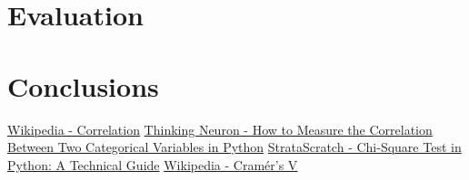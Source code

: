 \documentclass[runningheads]{paper}
\begin{document}

\section{Evaluation}

\section{Conclusions}


\pagebreak

\begin{thebibliography}{8}
    \bibitem{}
    \href{https://en.wikipedia.org/wiki/Correlation}{Wikipedia - Correlation}
    \bibitem{}
    \href{https://thinkingneuron.com/how-to-measure-the-correlation-between-two-categorical-variables-in-python/}{Thinking Neuron - How to Measure the Correlation Between Two Categorical Variables in Python}
    \bibitem{}
    \href{https://www.stratascratch.com/blog/chi-square-test-in-python-a-technical-guide/}{StrataScratch - Chi-Square Test in Python: A Technical Guide}
    \bibitem{}
    \href{https://en.wikipedia.org/wiki/Cram\%C3\%A9r\%27s\_V}{Wikipedia - Cramér's V}
    \bibitem{}
    
    \end{thebibliography}
\end{document}
